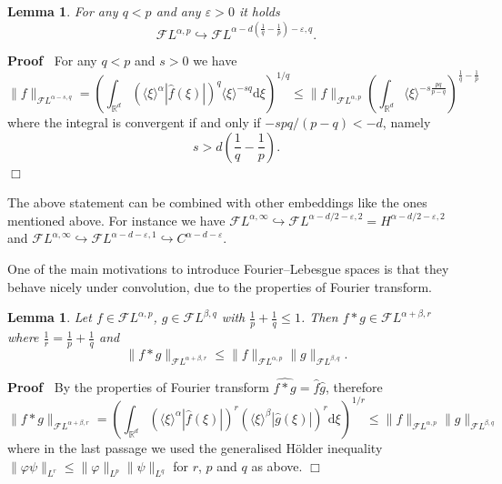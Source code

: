 \documentclass[10pt]{article}
\newcommand{\mathd}{\mathrm{d}}
\newenvironment{proof}{\noindent\textbf{Proof\ }}{\hspace*{\fill}$\Box$\medskip}
\newtheorem{lemma}[theorem]{Lemma}
\begin{document}
\begin{lemma}
  \label{appendixA2 fourier lebesgue embedding}For any $q < p$ and any
  $\varepsilon > 0$ it holds
  \[ \mathcal{F} L^{\alpha, p} \hookrightarrow \mathcal{F} L^{\alpha - d
     \left( \frac{1}{q} - \frac{1}{p} \right) - \varepsilon, q} . \]
\end{lemma}

\begin{proof}
  For any $q < p$ and $s > 0$ we have
  \[ \| f \|_{\mathcal{F} L^{\alpha - s, q}} = \left( \int_{\mathbb{R}^d}
     (\langle \xi \rangle^{\alpha} | \hat{f} (\xi) |)^q \langle \xi \rangle^{-
     s q} \mathd \xi \right)^{1 / q} \leqslant \| f \|_{\mathcal{F} L^{\alpha,
     p}}  \left( \int_{\mathbb{R}^d} \langle \xi \rangle^{- s \frac{p q}{p -
     q}} \right)^{\frac{1}{q} - \frac{1}{p}} \]
  where the integral is convergent if and only if $- s p q / (p - q) < - d$,
  namely
  \[ s > d \left( \frac{1}{q} - \frac{1}{p} \right) . \]
\end{proof}

The above statement can be combined with other embeddings like the ones
mentioned above. For instance we have $\mathcal{F} L^{\alpha, \infty}
\hookrightarrow \mathcal{F} L^{\alpha - d / 2 - \varepsilon, 2} = H^{\alpha -
d / 2 - \varepsilon, 2}$ and $\mathcal{F} L^{\alpha, \infty} \hookrightarrow
\mathcal{F} L^{\alpha - d - \varepsilon, 1} \hookrightarrow C^{\alpha - d -
\varepsilon}$.

One of the main motivations to introduce Fourier--Lebesgue spaces is that they
behave nicely under convolution, due to the properties of Fourier transform.

\begin{lemma}
  \label{appendixA2 fourier lebesgue convolution}Let $f \in \mathcal{F}
  L^{\alpha, p}$, $g \in \mathcal{F} L^{\beta, q}$ with $\frac{1}{p} +
  \frac{1}{q} \leqslant 1$. Then $f \ast g \in \mathcal{F} L^{\alpha + \beta,
  r}$ where $\frac{1}{r} = \frac{1}{p} + \frac{1}{q}$ and
  \[ \| f \ast g \|_{\mathcal{F} L^{\alpha + \beta, r}} \leqslant \| f
     \|_{\mathcal{F} L^{\alpha, p}} \| g \|_{\mathcal{F} L^{\beta, q}} . \]
\end{lemma}

\begin{proof}
  By the properties of Fourier transform $\widehat{f \ast g} = \widehat{f} 
  \hat{g}$, therefore
  \[ \| f \ast g \|_{\mathcal{F} L^{\alpha + \beta, r}} = \left(
     \int_{\mathbb{R}^d} (\langle \xi \rangle^{\alpha} | \hat{f} (\xi) |)^r 
     (\langle \xi \rangle^{\beta} | \hat{g} (\xi) |)^r \mathd \xi \right)^{1 /
     r} \leqslant \| f \|_{\mathcal{F} L^{\alpha, p}} \| g \|_{\mathcal{F}
     L^{\beta, q}} \]
  where in the last passage we used the generalised H\"{o}lder inequality $\|
  \varphi \psi \|_{L^r} \leqslant \| \varphi \|_{L^p} \| \psi \|_{L^q}$ for
  $r$, $p$ and $q$ as above.
\end{proof}
\end{document}
